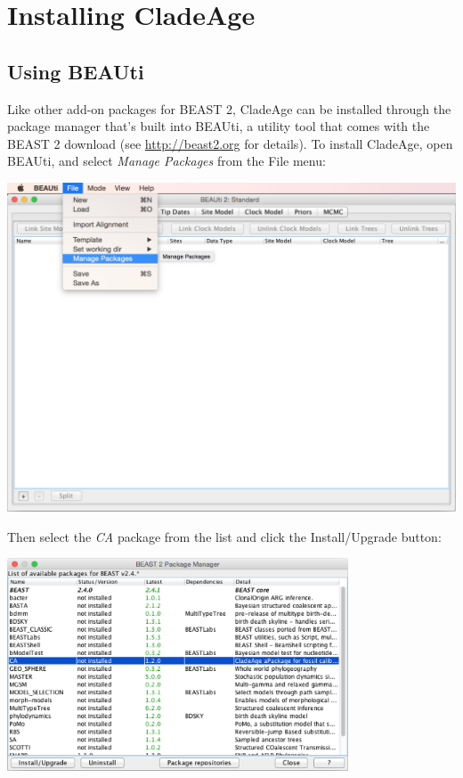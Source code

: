 \documentclass{article}
\begin{document}
\section{Installing CladeAge}

\subsection{Using BEAUti}\label{using_beauti}

Like other add-on packages for BEAST 2, CladeAge can be installed through the package manager that's built into BEAUti, a utility tool that comes with the BEAST 2 download (see \href{http://beast2.org}{http://beast2.org} for details). To install CladeAge, open BEAUti, and select \emph{Manage Packages} from the File menu:

\begin{center}\includegraphics[width=\textwidth]{fig2.png}\end{center}

\noindent
Then select the \emph{CA} package from the list and click the Install/Upgrade button:

\begin{center}\includegraphics[width=0.76\textwidth]{fig3.png}\end{center}
\end{document}
